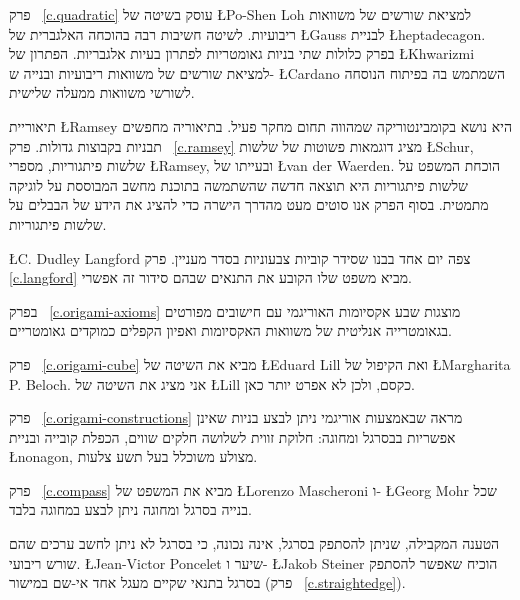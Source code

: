 
פרק~%
\ref{c.quadratic}
עוסק בשיטה של
\L{Po-Shen Loh}
למציאת שורשים של משוואות ריבועיות. לשיטה חשיבות רבה בהוכחה האלגברית של
\L{Gauss}
לבניית 
\L{heptadecagon}.
בפרק כלולות שתי בניות גאומטריות לפתרון בעיות אלגבריות. הפתרון של
\L{Khwarizmi}
למציאת שורשים של משוואות ריבועיות ובנייה ש-%
\L{Cardano}
השמתמש בה בפיתוח הנוסחה לשורשי משוואות ממעלה שלישית.


תיאוריית 
\L{Ramsey}
היא נושא בקומבינטוריקה שמהווה תחום מחקר פעיל. בתיאוריה מחפשים תבניות בקבוצות גדולות. פרק~%
\ref{c.ramsey}
מציג דוגמאות פשוטות של שלשות
\L{Schur},
שלשות פיתגוריות,
מספרי 
\L{Ramsey},
ובעייתו של
\L{van der Waerden}.
הוכחת המשפט על שלשות פיתגוריות היא תוצאה חדשה שהשתמשה בתוכנת מחשב המבוססת על לוגיקה מתמטית. בסוף הפרק אנו סוטים מעט מהדרך הישרה כדי להציג את הידע של הבבלים על שלשות פיתגוריות.

\L{C. Dudley Langford}
צפה יום אחד בבנו שסידר קוביות צבעוניות בסדר מעניין. 
פרק~%
\ref{c.langford}
מביא משפט שלו הקובע את התנאים שבהם סידור זה אפשרי.


\newpage

בפרק%
~\ref{c.origami-axioms}
מוצגות שבע אקסיומות האוריגמי עם חישובים מפורטים בגאומטרייה אנליטית של משוואות האקסיומות ואפיון הקפלים כמוקדים גאומטריים.

פרק~%
\ref{c.origami-cube}
מביא את השיטה של
\L{Eduard Lill}
ואת הקיפול של
\L{Margharita P. Beloch}.
אני מציג את השיטה של
\L{Lill}
כקסם, ולכן לא אפרט יותר כאן.

פרק~%
\ref{c.origami-constructions}
מראה שבאמצעות אוריגמי ניתן לבצע בניות שאינן אפשריות בבסרגל ומחוגה: חלוקת זווית לשלושה חלקים שווים, הכפלת קובייה ובניית 
\L{nonagon},
מצולע משוכלל בעל תשע צלעות.


פרק~%
\ref{c.compass}
מביא את המשפט של 
\L{Lorenzo Mascheroni}
ו-%
\L{Georg Mohr} 
שכל בנייה בסרגל ומחוגה ניתן לבצע במחוגה בלבד.

הטענה המקבילה, שניתן להסתפק בסרגל, אינה נכונה, כי בסרגל לא ניתן לחשב ערכים שהם שורש ריבועי.
\L{Jean-Victor Poncelet}
שיער ו-%
\L{Jakob Steiner}
הוכיח שאפשר להסתפק בסרגל בתנאי שקיים מעגל אחד אי-שם במישור (פרק~%
\ref{c.straightedge}).


